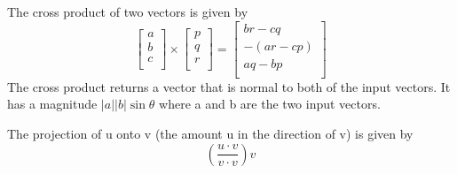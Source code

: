 \documentclass[12pt] {article}
\begin{document}
The cross product of two vectors is given by 
\begin{equation*}
  \begin{bmatrix}
    a \\
    b \\ 
    c \\
  \end{bmatrix} \times 
  \begin{bmatrix}
    p \\
    q \\ 
    r \\
  \end{bmatrix}
  =
  \begin{bmatrix}
    br-cq \\
    -(ar-cp) \\ 
    aq-bp \\
  \end{bmatrix}
\end{equation*}
The cross product returns a vector that is normal to both of the input vectors. It has a magnitude 
$|a||b|\sin\theta$ where a and b are the two input vectors.

The projection of u onto v (the amount u in the direction of v) is given by
\begin{equation*}
  (\frac{u\cdot v}{v\cdot v})v
\end{equation*}
\end{document}
